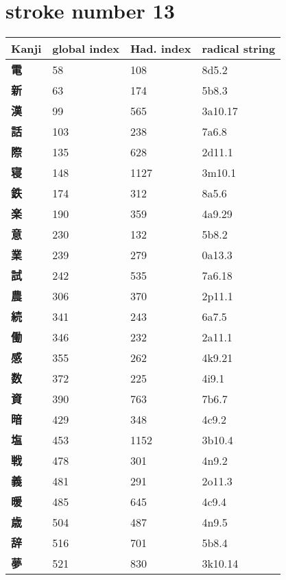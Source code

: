 \section{stroke number 13}
  \begin{longtable}[c]{llll}
    \bfseries Kanji & \bfseries global index & \bfseries Had. index & \bfseries radical string\\\hline\endhead
    \bfseries 電 & 58 & 108 & 8d5.2\\
    \bfseries 新 & 63 & 174 & 5b8.3\\
    \bfseries 漢 & 99 & 565 & 3a10.17\\
    \bfseries 話 & 103 & 238 & 7a6.8\\
    \bfseries 際 & 135 & 628 & 2d11.1\\
    \bfseries 寝 & 148 & 1127 & 3m10.1\\
    \bfseries 鉄 & 174 & 312 & 8a5.6\\
    \bfseries 楽 & 190 & 359 & 4a9.29\\
    \bfseries 意 & 230 & 132 & 5b8.2\\
    \bfseries 業 & 239 & 279 & 0a13.3\\
    \bfseries 試 & 242 & 535 & 7a6.18\\
    \bfseries 農 & 306 & 370 & 2p11.1\\
    \bfseries 続 & 341 & 243 & 6a7.5\\
    \bfseries 働 & 346 & 232 & 2a11.1\\
    \bfseries 感 & 355 & 262 & 4k9.21\\
    \bfseries 数 & 372 & 225 & 4i9.1\\
    \bfseries 資 & 390 & 763 & 7b6.7\\
    \bfseries 暗 & 429 & 348 & 4c9.2\\
    \bfseries 塩 & 453 & 1152 & 3b10.4\\
    \bfseries 戦 & 478 & 301 & 4n9.2\\
    \bfseries 義 & 481 & 291 & 2o11.3\\
    \bfseries 暖 & 485 & 645 & 4c9.4\\
    \bfseries 歳 & 504 & 487 & 4n9.5\\
    \bfseries 辞 & 516 & 701 & 5b8.4\\
    \bfseries 夢 & 521 & 830 & 3k10.14\\
  \end{longtable}
